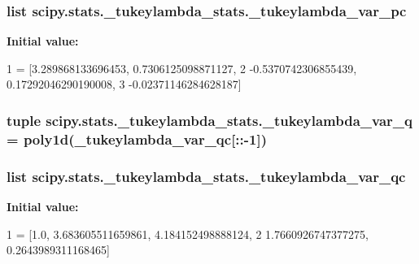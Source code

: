 \subsubsection[{\+\_\+tukeylambda\+\_\+var\+\_\+pc}]{\setlength{\rightskip}{0pt plus 5cm}list scipy.\+stats.\+\_\+tukeylambda\+\_\+stats.\+\_\+tukeylambda\+\_\+var\+\_\+pc}\label{namespacescipy_1_1stats_1_1__tukeylambda__stats_aab4deaecc63977072b318727f8f49cc1}
{\bfseries Initial value\+:}
\begin{DoxyCode}
1 = [3.289868133696453, 0.7306125098871127,
2                        -0.5370742306855439, 0.17292046290190008,
3                        -0.02371146284628187]
\end{DoxyCode}
\hypertarget{namespacescipy_1_1stats_1_1__tukeylambda__stats_a1897d6d27e16fe00a37d2e3ad8a95fce}{}
\subsubsection[{\+\_\+tukeylambda\+\_\+var\+\_\+q}]{\setlength{\rightskip}{0pt plus 5cm}tuple scipy.\+stats.\+\_\+tukeylambda\+\_\+stats.\+\_\+tukeylambda\+\_\+var\+\_\+q = poly1d({\bf \+\_\+tukeylambda\+\_\+var\+\_\+qc}\mbox{[}\+::-\/1\mbox{]})}\label{namespacescipy_1_1stats_1_1__tukeylambda__stats_a1897d6d27e16fe00a37d2e3ad8a95fce}
\hypertarget{namespacescipy_1_1stats_1_1__tukeylambda__stats_a466b2c42e10ec832fe5839ecddf29044}{}
\subsubsection[{\+\_\+tukeylambda\+\_\+var\+\_\+qc}]{\setlength{\rightskip}{0pt plus 5cm}list scipy.\+stats.\+\_\+tukeylambda\+\_\+stats.\+\_\+tukeylambda\+\_\+var\+\_\+qc}\label{namespacescipy_1_1stats_1_1__tukeylambda__stats_a466b2c42e10ec832fe5839ecddf29044}
{\bfseries Initial value\+:}
\begin{DoxyCode}
1 = [1.0, 3.683605511659861, 4.184152498888124,
2                        1.7660926747377275, 0.2643989311168465]
\end{DoxyCode}
